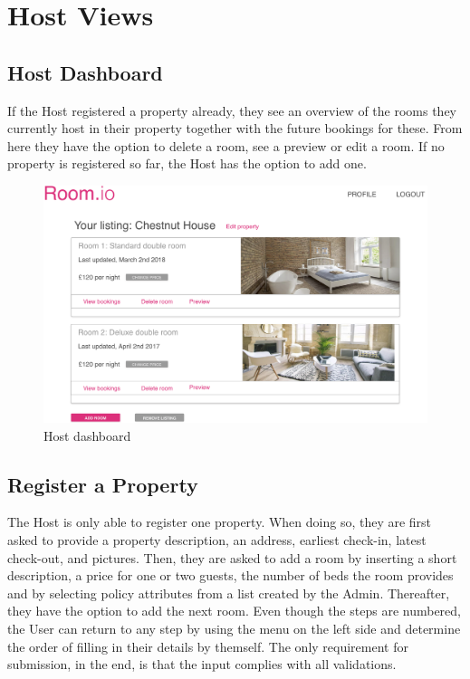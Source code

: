 \section{Host Views}
\subsection{Host Dashboard}
If the Host registered a property already, they see an overview of the rooms they currently host in their property together with the future bookings for these. From here they have the option to delete a room, see a preview or edit a room. If no property is registered so far, the Host has the option to add one.

\begin{figure}[H]
  \centering
  \includegraphics[width=17cm]{img/mockups/host_dashboard.png}
  \caption{Host dashboard}
  \label{Host_Dashboard}
\end{figure}

\subsection{Register a Property}
The Host is only able to register one property. When doing so, they are first asked to provide a property description, an address, earliest check-in, latest check-out, and pictures. Then, they are asked to add a room by inserting a short description, a price for one or two guests, the number of beds the room provides and by selecting policy attributes from a list created by the Admin. Thereafter, they have the option to add the next room. Even though the steps are numbered, the User can return to any step by using the menu on the left side and determine the order of filling in their details by themself. The only requirement for submission, in the end, is that the input complies with all validations. 

